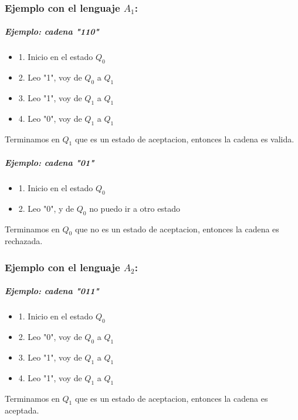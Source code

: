 \documentclass[a4paper, 12pt]{article}
\begin{document}
\subsubsection*{Ejemplo con el lenguaje \( A_1 \):}

\subparagraph{Ejemplo: cadena "110"}
\begin{itemize}
    \item 1. Inicio en el estado \( Q_0 \)
    \item 2. Leo "1", voy de \( Q_0 \) a \( Q_1 \)
    \item 3. Leo "1", voy de \( Q_1 \) a \( Q_1 \)
    \item 4. Leo "0", voy de \( Q_1 \) a \( Q_1 \)
\end{itemize}

\space
    Terminamos en \( Q_1 \) que es un estado de aceptacion, entonces la cadena es valida.

\space
\space
    \subparagraph{Ejemplo: cadena "01"}
\begin{itemize}
    \item 1. Inicio en el estado \( Q_0 \)
    \item 2. Leo "0", y de  \( Q_0 \) no puedo ir a otro estado
\end{itemize}

\space
    Terminamos en \( Q_0 \) que no es un estado de aceptacion, entonces la cadena es rechazada.

\subsubsection*{Ejemplo con el lenguaje \( A_2 \):}

\subparagraph{Ejemplo: cadena "011"}
\begin{itemize}
    \item 1. Inicio en el estado \( Q_0 \)
    \item 2. Leo "0", voy de \( Q_0 \) a \( Q_1 \)
    \item 3. Leo "1", voy de \( Q_1 \) a \( Q_1 \)
    \item 4. Leo "1", voy de \( Q_1 \) a \( Q_1 \)
\end{itemize}
    Terminamos en \( Q_1 \) que es un estado de aceptacion, entonces la cadena  es aceptada.
\end{document}
